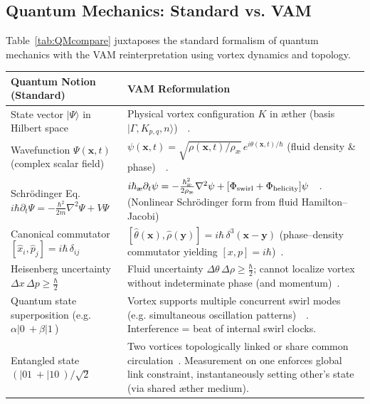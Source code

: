 \documentclass[a4paper,12pt]{article}
\begin{document}
    \subsection{Quantum Mechanics: Standard vs. VAM}
    Table~\ref{tab:QMcompare} juxtaposes the standard formalism of quantum mechanics with the VAM reinterpretation using vortex dynamics and topology.

    \begin{table}[H]
        \centering
        \scriptsize
        \begin{tabular}{p{} | p{}}
            \hline
            \textbf{Quantum Notion (Standard)} & \textbf{VAM Reformulation} \\
            \hline
            State vector $|\Psi\rangle$ in Hilbert space & Physical vortex configuration $K$ in æther (basis $|\Gamma, K_{p,q}, n\rangle$)~\cite{reference_179}~\cite{reference_180}. \\
            Wavefunction $\Psi(\mathbf{x},t)$ (complex scalar field) & $\psi(\mathbf{x},t) = \sqrt{\rho(\mathbf{x},t)/\rho_{\text{\ae}}}\,e^{i\theta(\mathbf{x},t)/\hbar}$ (fluid density \& phase)~\cite{reference_181}~\cite{reference_182}. \\
            Schrödinger Eq. $i\hbar\partial_t\Psi = -\frac{\hbar^2}{2m}\nabla^2\Psi + V\Psi$ & $i\hbar_{\text{\ae}}\partial_t\psi = -\frac{\hbar_{\text{\ae}}^2}{2\rho_{\text{\ae}}}\nabla^2\psi + [\Phi_{\rm swirl}+\Phi_{\rm helicity}]\psi$~\cite{reference_183}~\cite{reference_184}. (Nonlinear Schrödinger form from fluid Hamilton–Jacobi) \\
            Canonical commutator $[ \hat{x}_i, \hat{p}_j ] = i\hbar\,\delta_{ij}$ & $[\hat{\theta}(\mathbf{x}), \hat{\rho}(\mathbf{y})] = i\hbar\,\delta^3(\mathbf{x}-\mathbf{y})$ (phase–density commutator yielding $[x,p]=i\hbar$)~\cite{reference_185}. \\
            Heisenberg uncertainty $\Delta x\,\Delta p \ge \frac{\hbar}{2}$ & Fluid uncertainty $\Delta \theta\,\Delta \rho \ge \frac{\hbar}{2}$; cannot localize vortex without indeterminate phase (and momentum)~\cite{reference_186}. \\
            Quantum state superposition (e.g. $\alpha|0\>+\beta|1\>$) & Vortex supports multiple concurrent swirl modes (e.g. simultaneous oscillation patterns)~\cite{reference_187}~\cite{reference_188}. Interference = beat of internal swirl clocks. \\
            Entangled state $(|01\>+|10\>)/\sqrt{2}$ & Two vortices topologically linked or share common circulation~\cite{reference_189}. Measurement on one enforces global link constraint, instantaneously setting other’s state (via shared æther medium). \\

\end{tabular}
\end{table}
\end{document}
